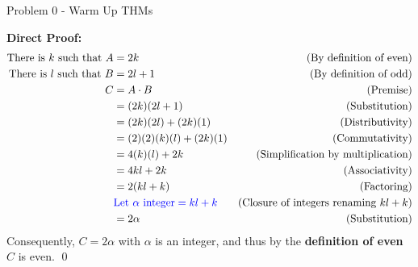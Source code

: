\begin{problem}{Problem 0 - Warm Up THMs}
\begin{Highlight}
        \textbf{Direct Proof:} \newline
        \begin{align*}
            \text{There is $k$ such that } A & = 2k & \text{(By definition of even)} \\
            \text{There is $l$ such that } B & = 2l + 1 & \text{(By definition of odd)} \\
            C & = A \cdot B & \text{(Premise)} \\
            & = (2k)(2l + 1) & \text{(Substitution)} \\
            & = (2k)(2l) + (2k)(1) & \text{(Distributivity)} \\
            & = (2)(2)(k)(l) + (2k)(1) & \text{(Commutativity)} \\
            & = 4(k)(l) + 2k & \text{(Simplification by multiplication)} \\
            & = 4kl + 2k & \text{(Associativity)} \\
            & = 2(kl + k) & \text{(Factoring)} \\
            & \textcolor{blue}{\text{Let } \alpha \text{ integer} = kl + k} & \text{(Closure of integers renaming $kl + k$)} \\
            & = 2\alpha & \text{(Substitution)} \\
        \end{align*}
        Consequently, $C = 2\alpha$ with $\alpha$ is an integer, and thus by the \textbf{definition of even} $C$ is even. \qed
    \end{Highlight}
\end{problem}

